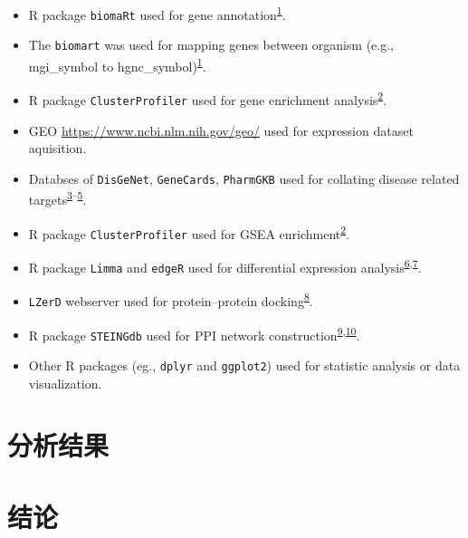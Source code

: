 \documentclass[
]{article}
\providecommand{\tightlist}{%
  \setlength{\itemsep}{0pt}\setlength{\parskip}{0pt}}
\begin{document}
\begin{itemize}
\tightlist
\item
  R package \texttt{biomaRt} used for gene annotation\textsuperscript{\protect\hyperlink{ref-MappingIdentifDurinc2009}{1}}.
\item
  The \texttt{biomart} was used for mapping genes between organism (e.g., mgi\_symbol to hgnc\_symbol)\textsuperscript{\protect\hyperlink{ref-MappingIdentifDurinc2009}{1}}.
\item
  R package \texttt{ClusterProfiler} used for gene enrichment analysis\textsuperscript{\protect\hyperlink{ref-ClusterprofilerWuTi2021}{2}}.
\item
  GEO \url{https://www.ncbi.nlm.nih.gov/geo/} used for expression dataset aquisition.
\item
  Databses of \texttt{DisGeNet}, \texttt{GeneCards}, \texttt{PharmGKB} used for collating disease related targets\textsuperscript{\protect\hyperlink{ref-TheDisgenetKnPinero2019}{3}--\protect\hyperlink{ref-PharmgkbAWorBarbar2018}{5}}.
\item
  R package \texttt{ClusterProfiler} used for GSEA enrichment\textsuperscript{\protect\hyperlink{ref-ClusterprofilerWuTi2021}{2}}.
\item
  R package \texttt{Limma} and \texttt{edgeR} used for differential expression analysis\textsuperscript{\protect\hyperlink{ref-LimmaPowersDiRitchi2015}{6},\protect\hyperlink{ref-EdgerDifferenChen}{7}}.
\item
  \texttt{LZerD} webserver used for protein--protein docking\textsuperscript{\protect\hyperlink{ref-LzerdWebserverChrist2021}{8}}.
\item
  R package \texttt{STEINGdb} used for PPI network construction\textsuperscript{\protect\hyperlink{ref-TheStringDataSzklar2021}{9},\protect\hyperlink{ref-CytohubbaIdenChin2014}{10}}.
\item
  Other R packages (eg., \texttt{dplyr} and \texttt{ggplot2}) used for statistic analysis or data visualization.
\end{itemize}

\hypertarget{results}{%
\section{分析结果}\label{results}}

\hypertarget{dis}{%
\section{结论}\label{dis}}
\end{document}
